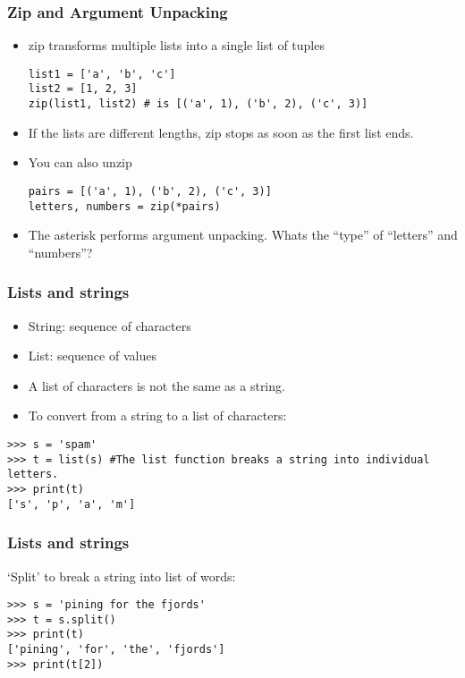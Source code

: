 \begin{frame}[fragile]\frametitle{Zip and Argument Unpacking}
  \begin{itemize}
  \item zip transforms multiple lists into a single list of tuples
  \begin{lstlisting}
list1 = ['a', 'b', 'c']
list2 = [1, 2, 3]
zip(list1, list2) # is [('a', 1), ('b', 2), ('c', 3)]
  \end{lstlisting}
\item 	If the	lists are different lengths, zip stops as soon as the first list ends.
\item You can also unzip
  \begin{lstlisting}
pairs = [('a', 1), ('b', 2), ('c', 3)]
letters, numbers = zip(*pairs)
  \end{lstlisting}
\item The asterisk performs argument unpacking. Whats the ``type'' of ``letters'' and ``numbers''?
  \end{itemize}
\end{frame}

\begin{frame}[fragile]\frametitle{Lists and strings}
  \begin{itemize}
  \item String: sequence of characters
  \item List: sequence of values
  \item A list of characters is not the same as a string. 
  \item To convert from a string to a list of characters:
  \end{itemize}
    \begin{lstlisting}
>>> s = 'spam'
>>> t = list(s) #The list function breaks a string into individual letters.
>>> print(t)
['s', 'p', 'a', 'm']
  \end{lstlisting}
\end{frame}

\begin{frame}[fragile]\frametitle{Lists and strings}
  `Split' to break a string into list of words:
     \begin{lstlisting}
>>> s = 'pining for the fjords'
>>> t = s.split()
>>> print(t)
['pining', 'for', 'the', 'fjords']
>>> print(t[2])
  \end{lstlisting}
\end{frame}



